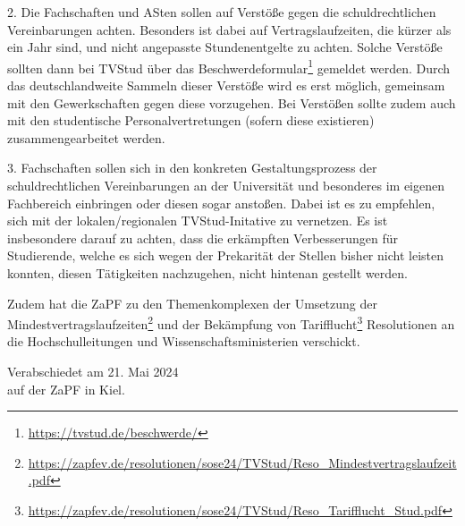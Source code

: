 \documentclass[DIV=calc]{scrartcl}
\begin{document}
2. Die Fachschaften und ASten sollen auf Verstöße gegen die schuldrechtlichen Vereinbarungen achten. Besonders ist dabei auf Vertragslaufzeiten, die kürzer als ein Jahr sind, und nicht angepasste Stundenentgelte zu achten. Solche Verstöße sollten dann bei TVStud über das Beschwerdeformular\footnote{\url{https://tvstud.de/beschwerde/}} gemeldet werden. Durch das deutschlandweite Sammeln dieser Verstöße wird es erst möglich, gemeinsam mit den Gewerkschaften gegen diese vorzugehen. Bei Verstößen sollte zudem auch mit den studentische Personalvertretungen (sofern diese existieren) zusammengearbeitet werden.

3. Fachschaften sollen sich in den konkreten Gestaltungsprozess der schuldrechtlichen Vereinbarungen an der Universität und besonderes im eigenen Fachbereich einbringen oder diesen sogar anstoßen. Dabei ist es zu empfehlen, sich mit der lokalen/regionalen TVStud-Initative zu vernetzen. Es ist insbesondere darauf zu achten, dass die erkämpften Verbesserungen für Studierende, welche es sich wegen der Prekarität der Stellen bisher nicht leisten konnten, diesen Tätigkeiten nachzugehen, nicht hintenan gestellt werden.
  
Zudem hat die ZaPF zu den Themenkomplexen der Umsetzung der Mindestvertragslaufzeiten\footnote{\url{https://zapfev.de/resolutionen/sose24/TVStud/Reso_Mindestvertragslaufzeit.pdf}} und der Bekämpfung von Tarifflucht\footnote{\url{https://zapfev.de/resolutionen/sose24/TVStud/Reso_Tarifflucht_Stud.pdf}} Resolutionen an die Hochschulleitungen und Wissenschaftsministerien verschickt.


%
\vfill
\begin{flushright}
	Verabschiedet am 21. Mai 2024 \\
	auf der ZaPF in Kiel.
\end{flushright}
\end{document}
